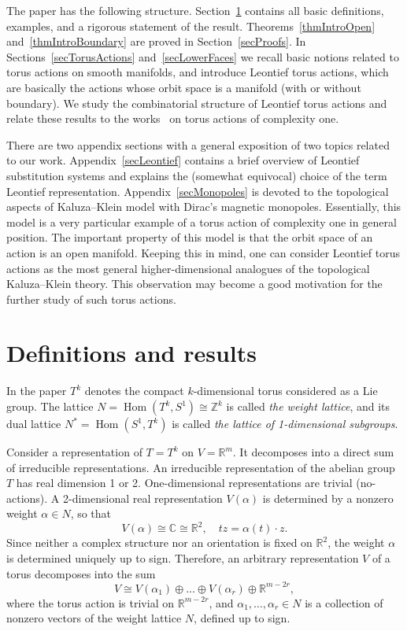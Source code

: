 \documentclass[english,12pt,oneside]{amsproc}
\DeclareMathOperator{\Hom}{Hom} \DeclareMathOperator{\rk}{rk}
\newcommand{\Zo}{\mathbb{Z}}
\newcommand{\Ro}{\mathbb{R}}
\newcommand{\Co}{\mathbb{C}}
\numberwithin{equation}{section}
\theoremstyle{plain}
\theoremstyle{definition}
\theoremstyle{remark}
\begin{document}
The paper has the following structure. Section~\ref{secDefinitions} contains all basic definitions, examples, and a rigorous statement of the result. Theorems~\ref{thmIntroOpen} and~\ref{thmIntroBoundary} are proved in Section~\ref{secProofs}. In Sections~\ref{secTorusActions} and~\ref{secLowerFaces} we recall basic notions related to torus actions on smooth manifolds, and introduce Leontief torus actions, which are basically the actions whose orbit space is a manifold (with or without boundary). We  study the combinatorial structure of Leontief torus actions and relate these results to the works~\cite{AyzCompl,Cher} on torus actions of complexity one.

There are two appendix sections with a general exposition of two topics related to our work. Appendix~\ref{secLeontief} contains a brief overview of Leontief substitution systems and explains the (somewhat equivocal) choice of the term Leontief representation. Appendix~\ref{secMonopoles} is devoted to the topological aspects of Kaluza--Klein model with Dirac's magnetic monopoles. Essentially, this model is a very particular example of a torus action of complexity one in general position. The important property of this model is that the orbit space of an action is an open manifold. Keeping this in mind, one can consider Leontief torus actions as the most general higher-dimensional analogues of the topological Kaluza--Klein theory. This observation may become a good motivation for the further study of such torus actions.



\section{Definitions and results}\label{secDefinitions}

In the paper $T^k$ denotes the compact $k$-dimensional torus considered as a Lie group. The lattice $N=\Hom(T^k,S^1)\cong \Zo^k$ is called \emph{the weight lattice}, and its dual lattice $N^*=\Hom(S^1,T^k)$ is called \emph{the lattice of 1-dimensional subgroups}.

Consider a representation of $T=T^k$ on $V=\Ro^{m}$. It decomposes into a direct sum of irreducible representations. An irreducible representation of the abelian group $T$ has real dimension 1 or 2. One-dimensional representations are trivial (no-actions). A 2-dimensional real representation $V(\alpha)$ is determined by a nonzero weight $\alpha\in N$, so that
\[
V(\alpha)\cong \Co\cong\Ro^2,\quad tz=\alpha(t)\cdot z.
\]
Since neither a complex structure nor an orientation is fixed on $\Ro^2$, the weight $\alpha$ is determined uniquely up to sign. Therefore, an arbitrary representation $V$ of a torus decomposes into the sum
\begin{equation}\label{eqDecomposition}
V\cong V(\alpha_1)\oplus\ldots\oplus V(\alpha_r)\oplus \Ro^{m-2r},
\end{equation}
where the torus action is trivial on $\Ro^{m-2r}$, and $\alpha_1,\ldots,\alpha_r\in N$ is a collection of nonzero vectors of the weight lattice $N$, defined up to sign.
\end{document}
